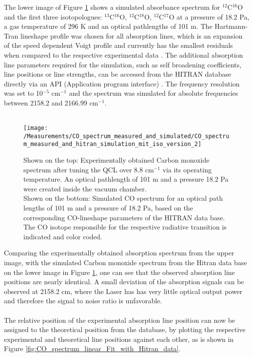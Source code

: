 \noindent
The lower image of Figure \ref{fig:CO_spectrum_measured_and_simulated} shows a simulated absorbance spectrum for $^{12}$C$^{16}$O and the first three isotopologues: $^{13}$C$^{16}$O, $^{12}$C$^{18}$O, $^{12}$C$^{17}$O  at a pressure of 18.2 Pa, a gas temperature of 296 K and an optical pathlengths of 101 m. The Hartmann-Tran lineshape profile was chosen for all absorption lines, which is an expansion of the speed dependent Voigt profile and currently has the smallest residuals when compared to the respective experimental data \cite{Hartmann-Tran}. The additional absorption line parameters required for the simulation, such as self broadening coefficients, line positions or line strengths, can be accessed from the HITRAN database directly via an API (Application program interface) \cite{HitranAPI}. The frequency resolution was set to 10$^{-5}$ cm$^{-1}$ and the spectrum was simulated for absolute frequencies between 2158.2 and 2166.99 cm$^{-1}$.\\\\
\noindent
\begin{figure}[H]
	\centering
	\texttt{[image: /Measurements/CO\_spectrum\_measured\_and\_simulated/CO\_spectrum\_measured\_and\_hitran\_simulation\_mit\_iso\_version\_2]}
	\caption{Shown on the top: Experimentally obtained Carbon monoxide spectrum after tuning the QCL over 8.8 cm$^{-1}$ via its operating temperature. An optical pathlength of 101 m and a pressure 18.2 Pa were created inside the vacuum chamber.\\ Shown on the bottom: Simulated CO spectrum for an optical path lengths of 101 m and a pressure of 18.2 Pa, based on the corresponding CO-lineshape parameters of the HITRAN data base. The CO isotope responsible for the respective radiative transition is indicated and color coded.}
	\label{fig:CO_spectrum_measured_and_simulated}
\end{figure}
\noindent
Comparing the experimentally obtained absorption spectrum from the upper image, with the simulated Carbon monoxide spectrum from the Hitran data base on the lower image in Figure \ref{fig:CO_spectrum_measured_and_simulated}, one can see that the observed absorption line positions are nearly identical. A small deviation of the absorption signals can be observed at 2158.2 cm, where the Laser has has very little optical output power and therefore the signal to noise ratio is unfavorable. \\\\
\noindent
The relative position of the experimental absorption line position can now be assigned to the theoretical position from the database, by plotting the respective experimental and theoretical line positions against each other, as is shown in Figure \ref{fig:CO_spectrum_linear_Fit_with_Hitran_data}.
